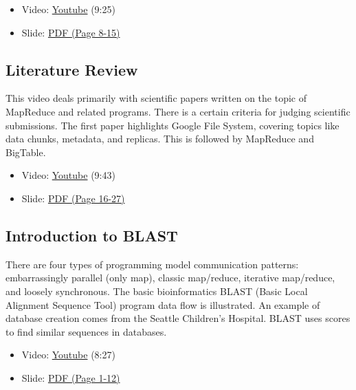 \begin{itemize}
\tightlist
\item
  Video: \href{https://www.youtube.com/watch?v=KWLY_maNEPA}{Youtube}
  (9:25)
\end{itemize}

\begin{itemize}
\tightlist
\item
  Slide:
  \href{https://drive.google.com/open?id=0B88HKpainTSfd3hkTG4yY2FYUVE}{PDF
  (Page 8-15)}
\end{itemize}

\subsection{Literature Review}\label{literature-review}

This video deals primarily with scientific papers written on the topic
of MapReduce and related programs. There is a certain criteria for
judging scientific submissions. The first paper highlights Google File
System, covering topics like data chunks, metadata, and replicas. This
is followed by MapReduce and BigTable.

\begin{itemize}
\tightlist
\item
  Video: \href{https://www.youtube.com/watch?v=5YmjrhEFQsk}{Youtube}
  (9:43)
\item
  Slide:
  \href{https://drive.google.com/open?id=0B88HKpainTSfd3hkTG4yY2FYUVE}{PDF
  (Page 16-27)}
\end{itemize}

\subsection{Introduction to BLAST}\label{introduction-to-blast}

There are four types of programming model communication patterns:
embarrassingly parallel (only map), classic map/reduce, iterative
map/reduce, and loosely synchronous. The basic bioinformatics BLAST
(Basic Local Alignment Sequence Tool) program data flow is illustrated.
An example of database creation comes from the Seattle Children's
Hospital. BLAST uses scores to find similar sequences in databases.

\begin{itemize}
\tightlist
\item
  Video: \href{https://www.youtube.com/watch?v=i3H9HmUYfq8}{Youtube}
  (8:27)
\item
  Slide:
  \href{https://drive.google.com/open?id=0B88HKpainTSfdnFvY1V3dlFTRlE}{PDF
  (Page 1-12)}
\end{itemize}

